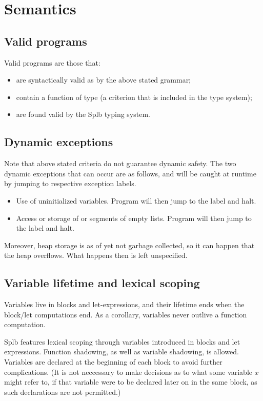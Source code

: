\documentclass[10pt]{article} %
\theoremstyle{definitionstyle}
\theoremstyle{lemmastyle}
\begin{document}
\section{Semantics}

\subsection{Valid programs}

Valid programs are those that:
\begin{itemize}
\item are syntactically valid as by the above stated grammar;
\item contain a function  of type  (a criterion that is included in the type system);
\item are found valid by the Splb typing system.
\end{itemize}

\subsection{Dynamic exceptions}

Note that above stated criteria do not guarantee dynamic safety. The two dynamic exceptions that can occur are as follows, and will be caught at runtime by jumping to respective exception labels.
\begin{itemize}
\item Use of uninitialized variables. Program will then jump to the  label and halt.
\item Access or storage of  or  segments of empty lists. Program will then jump to the  label and halt.
\end{itemize}

Moreover, heap storage is as of yet not garbage collected, so it can happen that the heap overflows. What happens then is left unspecified.

\subsection{Variable lifetime and lexical scoping}

Variables live in blocks and let-expressions, and their lifetime ends when the block/let computations end. As a corollary, variables never outlive a function computation.

Splb features lexical scoping through variables introduced in blocks and let expressions. Function shadowing, as well as variable shadowing, is allowed. Variables are declared at the beginning of each block to avoid further complications. (It is not neccessary to make decisions as to what some variable $x$ might refer to, if that variable were to be declared later on in the same block, as such declarations are not permitted.)
\end{document}
